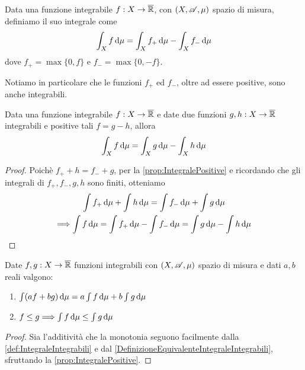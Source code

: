 \begin{definition}\label{def:IntegraleIntegrabili}
	Data una funzione integrabile $f:X\to\overline{\mathbb R}$, con $(X,\mathscr A,\mu)$ spazio di misura, definiamo il suo integrale come
	\begin{equation*}
		\int_X f\,\mathrm d\mu=\int_Xf_+\,\mathrm d\mu-\int_Xf_-\,\mathrm d\mu
	\end{equation*}
	dove $f_+=\max\{0,f\}$ e $f_-=\max\{0,-f\}$.
\end{definition}

\begin{remark}
	Notiamo in particolare che le funzioni $f_+$ ed $f_-$, oltre ad essere positive, sono anche integrabili.
\end{remark}

\begin{lemma}\label{DefinizioneEquivalenteIntegraleIntegrabili}
	Data una funzione integrabile $f:X\to\overline{\mathbb R}$ e date due funzioni $g,h:X\to \overline{\mathbb R}$ integrabili e positive tali $f=g-h$, allora
	\begin{equation*}
		\int_X f\,\mathrm d\mu=\int_Xg\,\mathrm d\mu-\int_Xh\,\mathrm d\mu
	\end{equation*}
\end{lemma}
\begin{proof}
	Poichè $f_++h=f_-+g$, per la \cref{prop:IntegralePositive} e ricordando che gli integrali di $f_+,f_-,g,h$ sono finiti, otteniamo
	\begin{gather*}
		\int  f_+\,\mathrm d\mu+\int  h\,\mathrm d\mu=\int  f_-\,\mathrm d\mu+\int  g\,\mathrm d\mu \\
		\Longrightarrow \int f\,\mathrm d\mu=\int f_+\,\mathrm d\mu-\int f_-\,\mathrm d\mu=\int g\,\mathrm d\mu-\int h\,\mathrm d\mu
	\end{gather*}

\end{proof}

\begin{proposition}\label{prop:IntegraleIntegrabili}
	Date $f,g:X\to\overline{\mathbb R}$ funzioni integrabili con $(X,\mathscr A,\mu)$ spazio di misura e dati $a,b$ reali valgono:
	\begin{enumerate}
		\item $\int (af+bg)\,\mathrm d\mu=a\int f\,\mathrm d\mu+b\int g\,\mathrm d\mu$ \label{PII:add}
		\item $f\le g\Longrightarrow \int f\,\mathrm d\mu\le \int g\,\mathrm d\mu$ \label{PII:mono}
	\end{enumerate}
\end{proposition}
\begin{proof}
	Sia l'additività che la monotonia seguono facilmente dalla \cref{def:IntegraleIntegrabili} e dal \cref{DefinizioneEquivalenteIntegraleIntegrabili}, sfruttando la \cref{prop:IntegralePositive}.
\end{proof}

